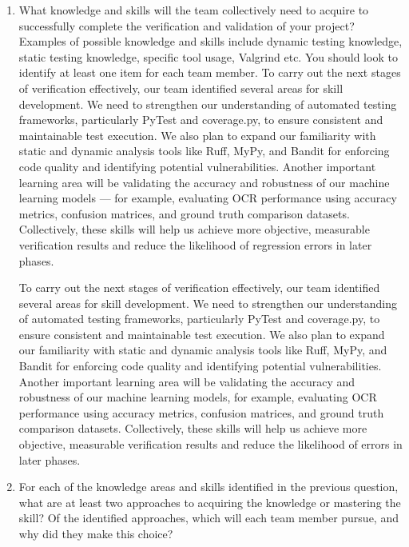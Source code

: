 \documentclass[12pt, titlepage]{article}
\begin{document}
\begin{enumerate}
  \item What knowledge and skills will the team collectively need to acquire to
  successfully complete the verification and validation of your project?
  Examples of possible knowledge and skills include dynamic testing knowledge,
  static testing knowledge, specific tool usage, Valgrind etc.  You should look to
  identify at least one item for each team member.\hspace{2em} To carry out the next stages of verification effectively, our team identified several areas for skill development. We need to strengthen our understanding of automated testing frameworks, particularly PyTest and coverage.py, to ensure consistent and maintainable test execution. We also plan to expand our familiarity with static and dynamic analysis tools like Ruff, MyPy, and Bandit for enforcing code quality and identifying potential vulnerabilities. Another important learning area will be validating the accuracy and robustness of our machine learning models — for example, evaluating OCR performance using accuracy metrics, confusion matrices, and ground truth comparison datasets. Collectively, these skills will help us achieve more objective, measurable verification results and reduce the likelihood of regression errors in later phases.

  \hspace{2em} To carry out the next stages of verification effectively, our team identified several areas for skill development. We need to strengthen our understanding of automated testing frameworks, particularly PyTest and coverage.py, to ensure consistent and maintainable test execution. We also plan to expand our familiarity with static and dynamic analysis tools like Ruff, MyPy, and Bandit for enforcing code quality and identifying potential vulnerabilities. Another important learning area will be validating the accuracy and robustness of our machine learning models, for example, evaluating OCR performance using accuracy metrics, confusion matrices, and ground truth comparison datasets. Collectively, these skills will help us achieve more objective, measurable verification results and reduce the likelihood of errors in later phases.

  \item For each of the knowledge areas and skills identified in the previous
  question, what are at least two approaches to acquiring the knowledge or
  mastering the skill?  Of the identified approaches, which will each team
  member pursue, and why did they make this choice?


\end{enumerate}
\end{document}
